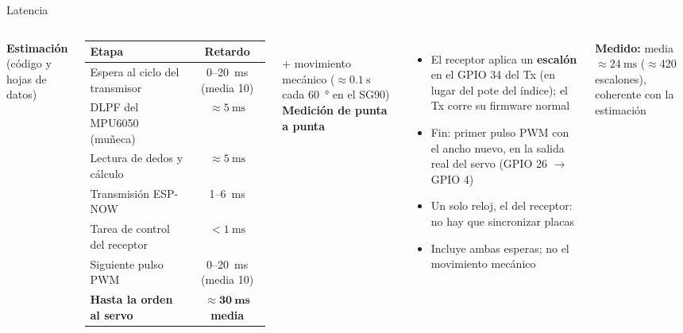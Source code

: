 \documentclass[aspectratio=169,10pt]{beamer}
\begin{document}
\begin{frame}{Latencia}
  \begin{columns}[T]
    \textbf{Estimación} (código y hojas de datos)\\[0.5ex]
    \scriptsize
    \begin{tabular}{l c}
      \toprule
      \textbf{Etapa} & \textbf{Retardo} \\
      \midrule
      Espera al ciclo del transmisor & 0--\SI{20}{\milli\second} (media 10) \\
      DLPF del MPU6050 (muñeca) & $\approx\SI{5}{\milli\second}$ \\
      Lectura de dedos y cálculo & $\approx\SI{5}{\milli\second}$ \\
      Transmisión ESP-NOW & 1--\SI{6}{\milli\second} \\
      Tarea de control del receptor & $<\SI{1}{\milli\second}$ \\
      Siguiente pulso PWM & 0--\SI{20}{\milli\second} (media 10) \\
      \midrule
      \textbf{Hasta la orden al servo} & $\boldsymbol{\approx\SI{30}{\milli\second}}$ \textbf{media} \\
      \bottomrule
    \end{tabular}\\[0.5ex]
    \small + movimiento mecánico ($\approx\SI{0.1}{\second}$ cada \SI{60}{\degree} en el SG90)
    \textbf{Medición de punta a punta}
    \begin{itemize}\small
      \item El receptor aplica un \textbf{escalón} en el GPIO 34 del Tx (en lugar del pote del índice); el Tx corre su firmware normal
      \item Fin: primer pulso PWM con el ancho nuevo, en la salida real del servo (GPIO 26 $\rightarrow$ GPIO 4)
      \item Un solo reloj, el del receptor: no hay que sincronizar placas
      \item Incluye ambas esperas; no el movimiento mecánico
    \end{itemize}
    \vspace{1ex}
    \textbf{Medido:} \alert{media $\approx\SI{24}{\milli\second}$} ($\approx$420 escalones), coherente con la estimación
  \end{columns}
\end{frame}
\end{document}
